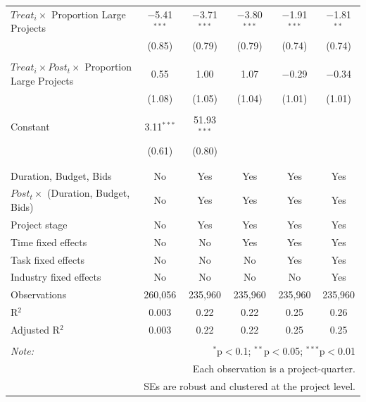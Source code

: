 \documentclass[
]{article}
\begin{document}
\begin{table}[H]
\begin{tabular}{@{\extracolsep{-2pt}}lccccc}
 $Treat_i \times$ Proportion Large Projects & $-$5.41$^{***}$ & $-$3.71$^{***}$ & $-$3.80$^{***}$ & $-$1.91$^{***}$ & $-$1.81$^{**}$ \\ 
  & (0.85) & (0.79) & (0.79) & (0.74) & (0.74) \\ 
  & & & & & \\ 
 $Treat_i \times Post_t \times$ Proportion Large Projects & 0.55 & 1.00 & 1.07 & $-$0.29 & $-$0.34 \\ 
  & (1.08) & (1.05) & (1.04) & (1.01) & (1.01) \\ 
  & & & & & \\ 
 Constant & 3.11$^{***}$ & 51.93$^{***}$ &  &  &  \\ 
  & (0.61) & (0.80) &  &  &  \\ 
  & & & & & \\ 
\hline \\[-1.8ex] 
Duration, Budget, Bids & No & Yes & Yes & Yes & Yes \\ 
$Post_t \times $  (Duration, Budget, Bids) & No & Yes & Yes & Yes & Yes \\ 
Project stage & No & Yes & Yes & Yes & Yes \\ 
Time fixed effects & No & No & Yes & Yes & Yes \\ 
Task fixed effects & No & No & No & Yes & Yes \\ 
Industry fixed effects & No & No & No & No & Yes \\ 
Observations & 260,056 & 235,960 & 235,960 & 235,960 & 235,960 \\ 
R$^{2}$ & 0.003 & 0.22 & 0.22 & 0.25 & 0.26 \\ 
Adjusted R$^{2}$ & 0.003 & 0.22 & 0.22 & 0.25 & 0.25 \\ 
\hline 
\hline \\[-1.8ex] 
\textit{Note:}  & \multicolumn{5}{r}{$^{*}$p$<$0.1; $^{**}$p$<$0.05; $^{***}$p$<$0.01} \\ 
 & \multicolumn{5}{r}{Each observation is a project-quarter.} \\ 
 & \multicolumn{5}{r}{SEs are robust and clustered at the project level.} \\ 
\end{tabular} 
\end{table}
\end{document}
